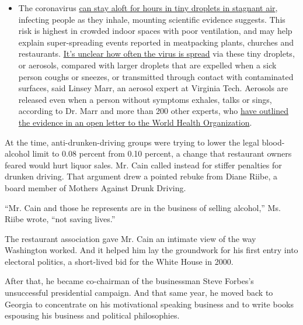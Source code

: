 \begin{itemize}
  \begin{itemize}
  \tightlist
  \item
    The coronavirus
    \href{https://www.nytimes.com/2020/07/04/health/239-experts-with-one-big-claim-the-coronavirus-is-airborne.html?action=click\&pgtype=Article\&state=default\&region=MAIN_CONTENT_3\&context=storylines_faq}{can
    stay aloft for hours in tiny droplets in stagnant air}, infecting
    people as they inhale, mounting scientific evidence suggests. This
    risk is highest in crowded indoor spaces with poor ventilation, and
    may help explain super-spreading events reported in meatpacking
    plants, churches and restaurants.
    \href{https://www.nytimes.com/2020/07/06/health/coronavirus-airborne-aerosols.html?action=click\&pgtype=Article\&state=default\&region=MAIN_CONTENT_3\&context=storylines_faq}{It's
    unclear how often the virus is spread} via these tiny droplets, or
    aerosols, compared with larger droplets that are expelled when a
    sick person coughs or sneezes, or transmitted through contact with
    contaminated surfaces, said Linsey Marr, an aerosol expert at
    Virginia Tech. Aerosols are released even when a person without
    symptoms exhales, talks or sings, according to Dr. Marr and more
    than 200 other experts, who
    \href{https://academic.oup.com/cid/article/doi/10.1093/cid/ciaa939/5867798}{have
    outlined the evidence in an open letter to the World Health
    Organization}.
  \end{itemize}
\end{itemize}

At the time, anti-drunken-driving groups were trying to lower the legal
blood-alcohol limit to 0.08 percent from 0.10 percent, a change that
restaurant owners feared would hurt liquor sales. Mr. Cain called
instead for stiffer penalties for drunken driving. That argument drew a
pointed rebuke from Diane Riibe, a board member of Mothers Against Drunk
Driving.

``Mr. Cain and those he represents are in the business of selling
alcohol,'' Ms. Riibe wrote, ``not saving lives.''

The restaurant association gave Mr. Cain an intimate view of the way
Washington worked. And it helped him lay the groundwork for his first
entry into electoral politics, a short-lived bid for the White House in
2000.

After that, he became co-chairman of the businessman Steve Forbes's
unsuccessful presidential campaign. And that same year, he moved back to
Georgia to concentrate on his motivational speaking business and to
write books espousing his business and political philosophies.


